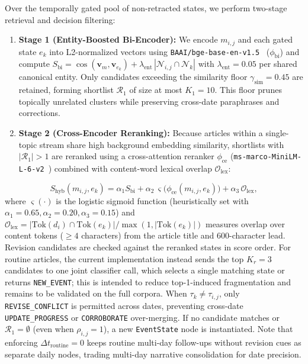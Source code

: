 \documentclass[journal]{IEEEtran}
\begin{document}
Over the temporally gated pool of non-retracted states, we perform two-stage retrieval and decision filtering:
\begin{enumerate}
    \item \textbf{Stage 1 (Entity-Boosted Bi-Encoder):} We encode $m_{i,j}$ and each gated state $e_k$ into L2-normalized vectors using \texttt{BAAI/bge-base-en-v1.5}~\cite{xiao2024cpack} ($\phi_{\text{bi}}$) and compute $S_{\text{bi}} = \cos(\mathbf{v}_{m}, \mathbf{v}_{e_k}) + \lambda_{\text{ent}}\, |\mathcal{N}_{i,j} \cap \mathcal{N}_k|$ with $\lambda_{\text{ent}} = 0.05$ per shared canonical entity. Only candidates exceeding the similarity floor $\gamma_{\text{sim}} = 0.45$ are retained, forming shortlist $\mathcal{R}_1$ of size at most $K_1 = 10$. This floor prunes topically unrelated clusters while preserving cross-date paraphrases and corrections.
    \item \textbf{Stage 2 (Cross-Encoder Reranking):} Because articles within a single-topic stream share high background embedding similarity, shortlists with $|\mathcal{R}_1| > 1$ are reranked using a cross-attention reranker $\phi_{\text{ce}}$ (\texttt{ms-marco-MiniLM-L-6-v2}~\cite{wang2020minilm, nguyen2016msmarco}) combined with content-word lexical overlap $\mathcal{O}_{\text{lex}}$:
\end{enumerate}
\begin{equation}
S_{\text{hyb}}(m_{i,j}, e_k) = \alpha_1 S_{\text{bi}} + \alpha_2\,\varsigma\big(\phi_{\text{ce}}(m_{i,j}, e_k)\big) + \alpha_3\,\mathcal{O}_{\text{lex}},
\label{eq:hybrid_rerank}
\end{equation}
where $\varsigma(\cdot)$ is the logistic sigmoid function (heuristically set with $\alpha_1=0.65, \alpha_2=0.20, \alpha_3=0.15$) and $\mathcal{O}_{\text{lex}} = |\text{Tok}(d_i)\cap\text{Tok}(e_k)| / \max(1, |\text{Tok}(e_k)|)$ measures overlap over content tokens ($\ge 4$ characters) from the article title and 600-character lead. Revision candidates are checked against the reranked states in score order. For routine articles, the current implementation instead sends the top $K_r=3$ candidates to one joint classifier call, which selects a single matching state or returns \texttt{NEW\_EVENT}; this is intended to reduce top-1-induced fragmentation and remains to be validated on the full corpora. When $\tau_k \neq \tau_{i,j}$, only \texttt{REVISE\_CONFLICT} is permitted across dates, preventing cross-date \texttt{UPDATE\_PROGRESS} or \texttt{CORROBORATE} over-merging. If no candidate matches or $\mathcal{R}_1 = \emptyset$ (even when $\rho_{i,j}=1$), a new \texttt{EventState} node is instantiated. Note that enforcing $\Delta t_{\text{routine}}=0$ keeps routine multi-day follow-ups without revision cues as separate daily nodes, trading multi-day narrative consolidation for date precision.
\end{document}
